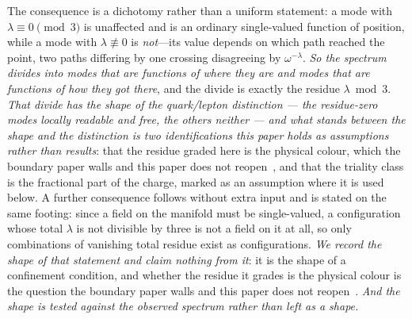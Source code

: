 \documentclass[11pt]{article}
\begin{document}
The consequence is a dichotomy rather than a uniform statement: a mode with
$\lambda\equiv0\pmod 3$ is unaffected and is an ordinary single-valued function of position, while a mode with
$\lambda\not\equiv0$ is \emph{not}---its value depends on which path reached the point, two paths differing by
one crossing disagreeing by $\omega^{-\lambda}$. \emph{So the spectrum divides into modes that are functions of
where they are and modes that are functions of how they got there}, and the divide is exactly the residue
$\lambda\bmod3$. \emph{That divide has the shape of the quark/lepton distinction --- the residue-zero modes
locally readable and free, the others neither --- and what stands between the shape and the distinction is two
identifications this paper holds as assumptions rather than results}: that the residue graded here is the
physical colour, which the boundary paper walls and this paper does not reopen~\cite{JanzenBoundary}, and that
the triality class is the fractional part of the charge, marked as an assumption where it is used below. A further
consequence follows without extra input and is stated on the same footing: since a field on the manifold must be
single-valued, a configuration whose total $\lambda$ is not divisible by three is not a field on it at all, so
only combinations of vanishing total residue exist as configurations. \emph{We record the shape of that
statement and claim nothing from it}: it is the shape of a confinement condition, and whether the residue it
grades is the physical colour is the question the boundary paper walls and this paper does not
reopen~\cite{JanzenBoundary}.
\emph{And the shape is tested against the observed spectrum rather than left as a shape.}  
\end{document}
